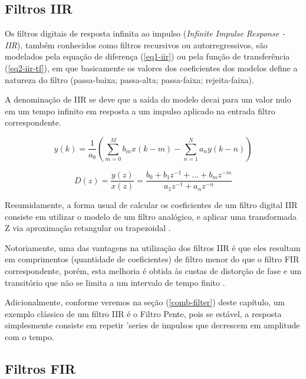 	\subsection{Filtros IIR}
	\label{IIR-section}	
		Os filtros digitais de resposta infinita ao impulso (\textit{Infinite Impulse Response - IIR}), também conhecidos como filtros recursivos ou autorregressivos, são modelados pela equação de diferença (\ref{eq1-iir}) ou pela função de transferência (\ref{eq2-iir-tf}), em que basicamente os valores dos coeficientes dos modelos define a natureza do filtro (passa-baixa; passa-alta; passa-faixa; rejeita-faixa).
		
		A denominação de IIR se deve que a saída do modelo decai para um valor nulo em um tempo infinito em resposta a um impulso aplicado na entrada filtro correspondente.
		
		\begin{equation}
			y(k) = \frac{1}{a_0}\left(\sum_{m=0}^{M}b_mx(k-m)-\sum_{n=1}^{N} a_ny(k-n)\right)
			\label{eq1-iir}
		\end{equation}
		
		\begin{equation}
			D(z) = \frac{y(z)}{x(z)} = \frac{b_0 + b_1z^{-1}+...+ b_mz^{-m}}{a_1z^{-1}+ a_nz^{-n}}
			\label{eq2-iir-tf}
		\end{equation}
		
		Resumidamente, a forma usual de calcular os coeficientes de um filtro digital IIR consiste em utilizar o modelo de um filtro analógico, e aplicar uma transformada Z via aproximação retangular ou trapezoidal \cite{Oppenhein1998}.
		
		Notoriamente, uma das vantagens na utilização dos filtros IIR é que eles resultam em comprimentos (quantidade de coeficientes) de filtro menor do que o filtro FIR correspondente, porém, esta melhoria é obtida às custas de distorção de fase e um transitório que não se limita a um intervalo de tempo finito \cite{Roberts1987}.
		
		Adicionalmente, conforme veremos na seção (\ref{comb-filter}) deste capítulo, um exemplo clássico de um filtro IIR é o Filtro Pente, pois se estável, a resposta simplesmente consiste em repetir 'series de impulsos que decrescem em amplitude com o tempo.
		
		
	\subsection{Filtros FIR}
		
